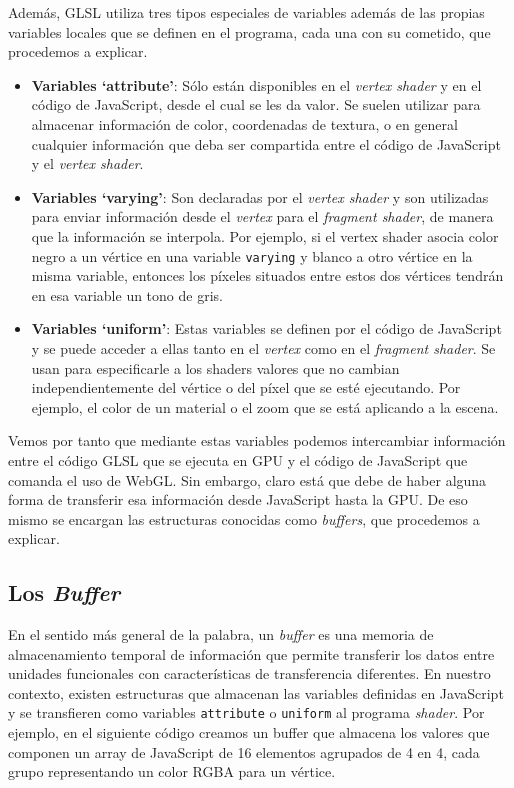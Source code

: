 Además, GLSL utiliza tres tipos especiales de variables además de las propias variables locales que se definen en el programa, cada una con su cometido, que procedemos a explicar.

\begin{itemize}
    \item \textbf{Variables `attribute'}: Sólo están disponibles en el \textit{vertex shader} y en el código de JavaScript, desde el cual se les da valor. Se suelen utilizar para almacenar información de color, coordenadas de textura, o en general cualquier información que deba ser compartida entre el código de JavaScript y el \textit{vertex shader}.
    \item \textbf{Variables `varying'}: Son declaradas por el \textit{vertex shader} y son utilizadas para enviar información desde el \textit{vertex} para el \textit{fragment shader}, de manera que la información se interpola. Por ejemplo, si el vertex shader asocia color negro a un vértice en una variable \verb|varying| y blanco a otro vértice en la misma variable, entonces los píxeles situados entre estos dos vértices tendrán en esa variable un tono de gris.
    \item \textbf{Variables `uniform'}: Estas variables se definen por el código de JavaScript y se puede acceder a ellas tanto en el \textit{vertex} como en el \textit{fragment shader}. Se usan para especificarle a los shaders valores que no cambian independientemente del vértice o del píxel que se esté ejecutando. Por ejemplo, el color de un material o el zoom que se está aplicando a la escena.
\end{itemize}

Vemos por tanto que mediante estas variables podemos intercambiar información entre el código GLSL que se ejecuta en GPU y el código de JavaScript que comanda el uso de WebGL. Sin embargo, claro está que debe de haber alguna forma de transferir esa información desde JavaScript hasta la GPU. De eso mismo se encargan las estructuras conocidas como \textit{buffers}, que procedemos a explicar.

\subsection{Los \textit{Buffer}}
\label{subsection:buffer}

En el sentido más general de la palabra, un \textit{buffer} es una memoria de almacenamiento temporal de información que permite transferir los datos entre unidades funcionales con características de transferencia diferentes. En nuestro contexto, existen estructuras que almacenan las variables definidas en JavaScript y se transfieren como variables \verb|attribute| o \verb|uniform| al programa \textit{shader}. Por ejemplo, en el siguiente código creamos un buffer que almacena los valores que componen un array de JavaScript de 16 elementos agrupados de 4 en 4, cada grupo representando un color RGBA para un vértice.

